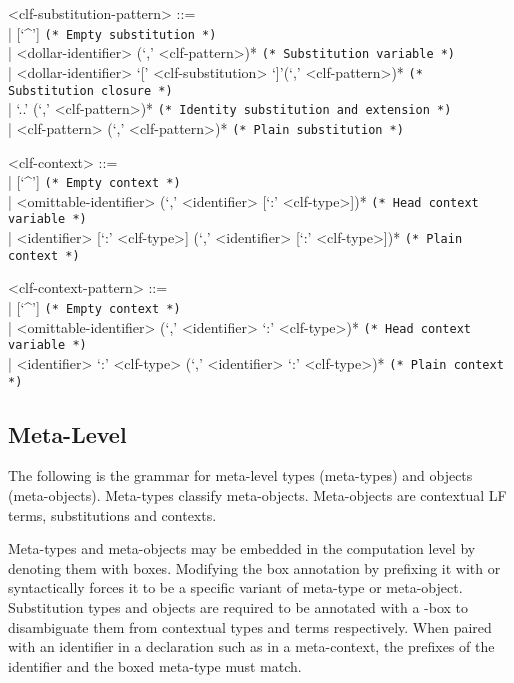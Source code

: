\documentclass[11pt]{article}
\newcommand{\LF}{\textsc{LF}\xspace}
\begin{document}
\begin{grammar}
<clf-substitution-pattern> ::= \hfill\\
| [`^'] \hfill \texttt{(* Empty substitution *)} \\
| <dollar-identifier> (`,' <clf-pattern>)* \hfill \texttt{(* Substitution variable *)}\\
| <dollar-identifier> `[' <clf-substitution> `]'(`,' <clf-pattern>)* \hfill \texttt{(* Substitution closure *)}\\
| `..' (`,' <clf-pattern>)* \hfill \texttt{(* Identity substitution and extension *)}\\
| <clf-pattern> (`,' <clf-pattern>)* \hfill \texttt{(* Plain substitution *)}

<clf-context> ::= \hfill\\
| [`^'] \hfill \texttt{(* Empty context *)}\\
| <omittable-identifier> (`,' <identifier> [`:' <clf-type>])* \hfill \texttt{(* Head context variable *)}\\
| <identifier> [`:' <clf-type>] (`,' <identifier> [`:' <clf-type>])* \hfill \texttt{(* Plain context *)}

<clf-context-pattern> ::= \hfill\\
| [`^'] \hfill \texttt{(* Empty context *)}\\
| <omittable-identifier> (`,' <identifier> `:' <clf-type>)* \hfill \texttt{(* Head context variable *)}\\
| <identifier> `:' <clf-type> (`,' <identifier> `:' <clf-type>)* \hfill \texttt{(* Plain context *)}
\end{grammar}

\subsection{Meta-Level}\label{section:syntax-meta-level}

The following is the grammar for meta-level types (meta-types) and objects (meta-objects).
Meta-types classify meta-objects.
Meta-objects are contextual \LF terms, substitutions and contexts.

Meta-types and meta-objects may be embedded in the computation level by denoting them with boxes.
Modifying the box annotation by prefixing it with \syntax{\#} or \syntax{\$} syntactically forces it to be a specific variant of meta-type or meta-object.
Substitution types and objects are required to be annotated with a \syntax{\$}-box to disambiguate them from contextual types and terms respectively.
When paired with an identifier in a declaration such as in a meta-context, the prefixes of the identifier and the boxed meta-type must match.
\end{document}
